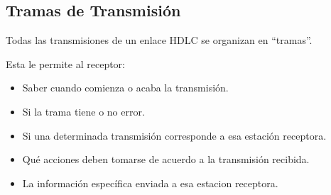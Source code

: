 \subsection*{Tramas de Transmisión}
Todas las transmisiones de un enlace HDLC se organizan en ``tramas''.


Esta le permite al receptor:
\begin{itemize}
\item Saber cuando comienza o acaba la transmisión.
\item Si la trama tiene o no error.
\item Si una determinada transmisión corresponde a esa estación receptora.
\item Qué acciones deben tomarse de acuerdo a la transmisión recibida.
\item La información específica enviada a esa estacion receptora.
\end{itemize}